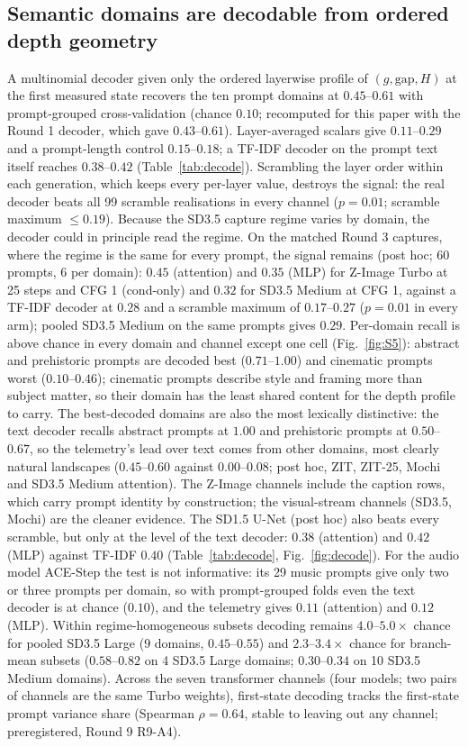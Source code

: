\documentclass[11pt]{article}
\newcommand{\gap}{\mathrm{gap}}
\newcommand{\TT}{ZIT-25}%
\begin{document}
\subsection{Semantic domains are decodable from ordered depth geometry}
A multinomial decoder given only the ordered layerwise profile of $(g,\gap,H)$ at the first measured state recovers the ten prompt domains at $0.45$--$0.61$ with prompt-grouped cross-validation (chance $0.10$; recomputed for this paper with the Round 1 decoder, which gave $0.43$--$0.61$). Layer-averaged scalars give $0.11$--$0.29$ and a prompt-length control $0.15$--$0.18$; a TF-IDF decoder on the prompt text itself reaches $0.38$--$0.42$ (Table~\ref{tab:decode}). Scrambling the layer order within each generation, which keeps every per-layer value, destroys the signal: the real decoder beats all 99 scramble realisations in every channel ($p=0.01$; scramble maximum $\le0.19$). Because the SD3.5 capture regime varies by domain, the decoder could in principle read the regime. On the matched Round 3 captures, where the regime is the same for every prompt, the signal remains (post hoc; 60 prompts, 6 per domain): $0.45$ (attention) and $0.35$ (MLP) for Z-Image Turbo at 25 steps and CFG 1 (cond-only) and $0.32$ for SD3.5 Medium at CFG 1, against a TF-IDF decoder at $0.28$ and a scramble maximum of $0.17$--$0.27$ ($p=0.01$ in every arm); pooled SD3.5 Medium on the same prompts gives $0.29$. Per-domain recall is above chance in every domain and channel except one cell (Fig.~\ref{fig:S5}): abstract and prehistoric prompts are decoded best ($0.71$--$1.00$) and cinematic prompts worst ($0.10$--$0.46$); cinematic prompts describe style and framing more than subject matter, so their domain has the least shared content for the depth profile to carry. The best-decoded domains are also the most lexically distinctive: the text decoder recalls abstract prompts at $1.00$ and prehistoric prompts at $0.50$--$0.67$, so the telemetry's lead over text comes from other domains, most clearly natural landscapes ($0.45$--$0.60$ against $0.00$--$0.08$; post hoc, ZIT, \TT{}, Mochi and SD3.5 Medium attention). The Z-Image channels include the caption rows, which carry prompt identity by construction; the visual-stream channels (SD3.5, Mochi) are the cleaner evidence. The SD1.5 U-Net (post hoc) also beats every scramble, but only at the level of the text decoder: $0.38$ (attention) and $0.42$ (MLP) against TF-IDF $0.40$ (Table~\ref{tab:decode}, Fig.~\ref{fig:decode}). For the audio model ACE-Step the test is not informative: its 29 music prompts give only two or three prompts per domain, so with prompt-grouped folds even the text decoder is at chance ($0.10$), and the telemetry gives $0.11$ (attention) and $0.12$ (MLP). Within regime-homogeneous subsets decoding remains $4.0$--$5.0\times$ chance for pooled SD3.5 Large (9 domains, $0.45$--$0.55$) and $2.3$--$3.4\times$ chance for branch-mean subsets ($0.58$--$0.82$ on 4 SD3.5 Large domains; $0.30$--$0.34$ on 10 SD3.5 Medium domains). Across the seven transformer channels (four models; two pairs of channels are the same Turbo weights), first-state decoding tracks the first-state prompt variance share (Spearman $\rho=0.64$, stable to leaving out any channel; preregistered, Round 9 R9-A4).
\end{document}
